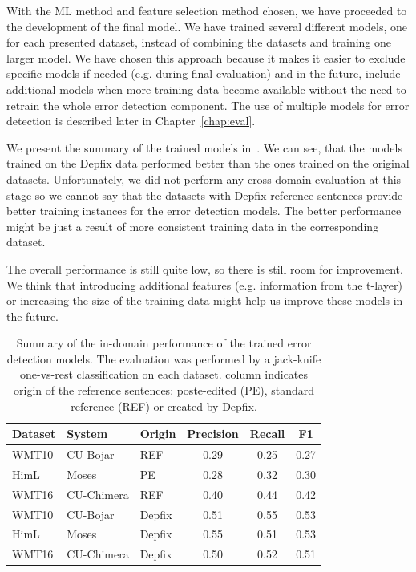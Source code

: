 With the ML method and feature selection method chosen, we have proceeded to 
the development of the final model.
We have trained several different models, one for each presented dataset, instead of combining
the datasets and training one larger model. We have chosen this approach because it makes
it easier to exclude specific models if needed (e.g. during final evaluation) and in the
future, include additional models when more training data become available without the need
to retrain the whole error detection component. The use of multiple models for error detection
is described later in Chapter~\ref{chap:eval}.

We present the summary of the trained models in~. We can see, that the models
trained on the Depfix data performed better than the ones trained on the original datasets.
Unfortunately, we did not perform any cross-domain evaluation at this stage so we cannot say
that the datasets with Depfix reference sentences provide better training instances for the
error detection models. The better performance might be just a result of more consistent
training data in the corresponding dataset.

The overall
performance is still quite low, so there is still room for improvement. We think that introducing
additional features (e.g. information from the t-layer) or increasing the size of the training data
might help us improve these models in the future.

\begin{table}[t]
\centering
\small

\begin{tabular}{lll|ccc}
Dataset  &  System  &  Origin  &  Precision  &  Recall  &  F1  \\
\hline
WMT10  &   CU-Bojar  &  REF  &  0.29  &  0.25  &  0.27  \\
HimL  &  Moses  &  PE  &  0.28  &  0.32  &  0.30  \\
WMT16  &  CU-Chimera  &  REF  &  0.40  &  0.44  &  0.42  \\
WMT10  &  CU-Bojar  &  Depfix  &  0.51  &  0.55  &  0.53  \\
HimL  &  Moses  &  Depfix  &  0.55  &  0.51  &  0.53  \\
WMT16  &  CU-Chimera  &  Depfix  &  0.50  &  0.52  &  0.51  \\
\end{tabular}
\caption[Model summary (Czech) - error detection]{
    Summary of the in-domain performance of the trained error detection models. The evaluation was performed
by a jack-knife one-vs-rest classification on each dataset.  column indicates origin
of the reference sentences: poste-edited (PE), standard reference (REF) or created by Depfix.
}
\label{wf-summary}
\end{table}


